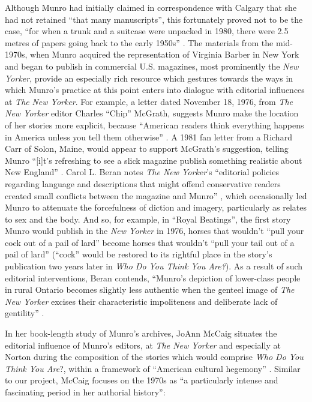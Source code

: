 \documentclass{article}
\begin{document}
Although Munro had initially claimed in correspondence with Calgary that
she had not retained ``that many manuscripts'', this fortunately proved
not to be the case, ``for when a trunk and a suitcase were unpacked in
1980, there were 2.5 metres of papers going back to the early 1950s''
\citep[xxix]{tener_archival_1986}. The materials from the mid-1970s,
when Munro acquired the representation of Virginia Barber in New York
and began to publish in commercial U.S. magazines, most prominently the
\emph{New Yorker}, provide an especially rich resource which gestures
towards the ways in which Munro's practice at this point enters into
dialogue with editorial influences at \emph{The} \emph{New Yorker}. For example, a letter dated
November 18, 1976, from \emph{The New Yorker} editor Charles
``Chip'' McGrath, suggests Munro make the location of her
stories more explicit, because ``American readers think everything
happens in America unless you tell them otherwise'' \citep{mcgrath_letter_1976}. A 1981 fan letter
from a Richard Carr of Solon, Maine, would appear to support McGrath's
suggestion, telling Munro ``{[}i{]}t's refreshing to see a slick
magazine publish something realistic about New England'' \citep{carr_letter_1981}. Carol L. Beran notes \emph{The New Yorker}'s ``editorial
policies regarding language and descriptions that might offend
conservative readers created small conflicts between the magazine and
Munro'' \citep[207]{beran_luxury_1998}, which occasionally led Munro to attenuate the
forcefulness of diction and imagery, particularly as relates to sex and
the body. And so, for example, in ``Royal Beatings'', the first story
Munro would publish in the \emph{New Yorker} in 1976, horses that
wouldn't ``pull your cock out of a pail of lard'' become horses that
wouldn't ``pull your tail out of a pail of lard'' \citep[207--208]{beran_luxury_1998} (``cock''
would be restored to its rightful place in the story's publication two
years later in \emph{Who Do You Think You Are?}). As a result of such
editorial interventions, Beran contends, ``Munro's depiction of
lower-class people in rural Ontario becomes slightly less authentic when
the genteel image of \emph{The} \emph{New Yorker} excises their
characteristic impoliteness and deliberate lack of gentility'' \citep[209]{beran_luxury_1998}.

In her book-length study of Munro's archives, JoAnn McCaig situates the
editorial influence of Munro's editors, at \emph{The New Yorker} and
especially at Norton during the composition of the stories which would
comprise \emph{Who Do You Think You Are}?, within a framework of
``American cultural hegemony'' \citep[121]{mccaig_reading_2002}. Similar to our project,
McCaig focuses on the 1970s as ``a particularly intense and fascinating
period in her authorial history'':
\end{document}

